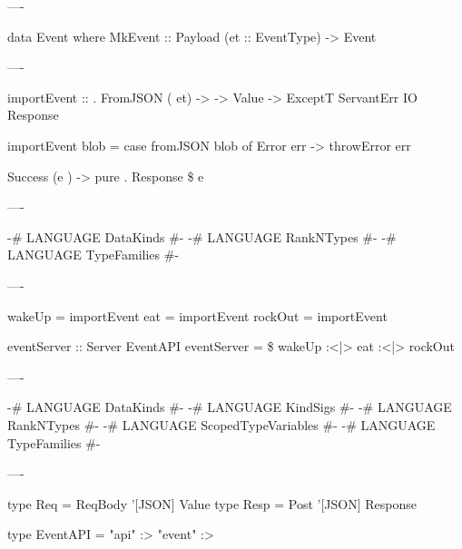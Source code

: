 ----

\begin{hs}
  data Event where
    MkEvent :: Payload (et :: EventType) -> Event
\end{hs}

----

\begin{raw}
  importEvent :: 
               . FromJSON ( et)
              -> 
              -> Value
              -> ExceptT ServantErr IO Response

  importEvent \note{_} blob =
    case fromJSON blob of
      Error err ->
        throwError err

      Success (e ) ->
        pure . Response \$  e
\end{raw}

----

\begin{raw}
  {-# LANGUAGE DataKinds           #-}
  {-# LANGUAGE RankNTypes          #-}
  {-# LANGUAGE TypeFamilies        #-}
\end{raw}


----

\begin{raw}
  wakeUp  = importEvent 
  eat     = importEvent 
  rockOut = importEvent 

  eventServer :: Server EventAPI
  eventServer =  \$
    wakeUp :<|> eat :<|> rockOut
\end{raw}

----

\begin{raw}
  {-# LANGUAGE DataKinds           #-}
  {-# LANGUAGE KindSigs            #-}
  {-# LANGUAGE RankNTypes          #-}
  {-# LANGUAGE ScopedTypeVariables #-}
  {-# LANGUAGE TypeFamilies        #-}
\end{raw}

----

\begin{raw}
  type Req  = ReqBody '[JSON] Value
  type Resp = Post    '[JSON] Response

  type EventAPI = "api" :> "event" :>
\end{raw}

